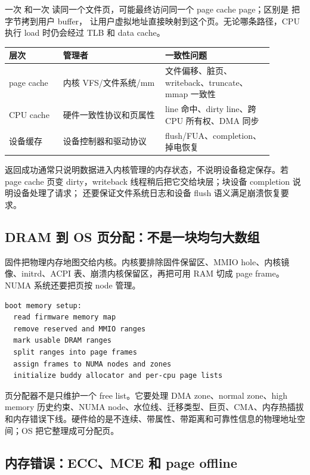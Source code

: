 一次  和一次  读同一个文件页，可能最终访问同一个 page cache page；区别是  把字节拷到用户 buffer， 让用户虚拟地址直接映射到这个页。无论哪条路径，CPU 执行 load 时仍会经过 TLB 和 data cache。

\begin{longtable}{p{0.18\linewidth}p{0.34\linewidth}p{0.36\linewidth}}
\toprule
层次 & 管理者 & 一致性问题 \\
\midrule
page cache & 内核 VFS/文件系统/mm & 文件偏移、脏页、writeback、truncate、mmap 一致性 \\
CPU cache & 硬件一致性协议和页属性 & line 命中、dirty line、跨 CPU 所有权、DMA 同步 \\
设备缓存 & 设备控制器和驱动协议 & flush/FUA、completion、掉电恢复 \\
\bottomrule
\end{longtable}

 返回成功通常只说明数据进入内核管理的内存状态，不说明设备稳定保存。若 page cache 页变 dirty，writeback 线程稍后把它交给块层；块设备 completion 说明设备处理了请求； 还要保证文件系统日志和设备 flush 语义满足崩溃恢复要求。

\subsection{DRAM 到 OS 页分配：不是一块均匀大数组}

固件把物理内存地图交给内核。内核要排除固件保留区、MMIO hole、内核镜像、initrd、ACPI 表、崩溃内核保留区，再把可用 RAM 切成 page frame。NUMA 系统还要把页按 node 管理。

\begin{lstlisting}
boot memory setup:
  read firmware memory map
  remove reserved and MMIO ranges
  mark usable DRAM ranges
  split ranges into page frames
  assign frames to NUMA nodes and zones
  initialize buddy allocator and per-cpu page lists
\end{lstlisting}

页分配器不是只维护一个 free list。它要处理 DMA zone、normal zone、high memory 历史约束、NUMA node、水位线、迁移类型、巨页、CMA、内存热插拔和内存错误下线。硬件给的是不连续、带属性、带距离和可靠性信息的物理地址空间；OS 把它整理成可分配页。

\subsection{内存错误：ECC、MCE 和 page offline}

